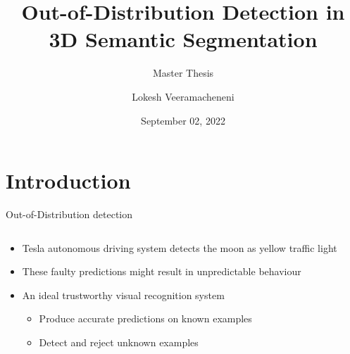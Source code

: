 \documentclass[aspectratio=169]{beamer}
\author[Veeramacheneni]{Lokesh Veeramacheneni}
\title{Out-of-Distribution Detection in 3D Semantic Segmentation}
\subtitle{Master Thesis}
\institute[HBRS]{Hochschule Bonn-Rhein-Sieg}
\date{September 02, 2022}
\begin{document}
{
\begin{frame}
\titlepage
\end{frame}
}

\section{Introduction}
\begin{frame}{Out-of-Distribution detection}
    \begin{columns}
        \begin{column}{0.5\textwidth}
            \begin{itemize}
                \item Tesla autonomous driving system detects the moon as yellow traffic light
                \item These faulty predictions might result in unpredictable behaviour
                \item An ideal trustworthy visual recognition system
                \begin{itemize}
                    \item Produce accurate predictions on known examples
                    \item Detect and reject unknown examples
                \end{itemize}
            \end{itemize}
        \end{column}
        \begin{column}{0.5\textwidth}
            

\end{column}
\end{columns}
\end{frame}
\end{document}

